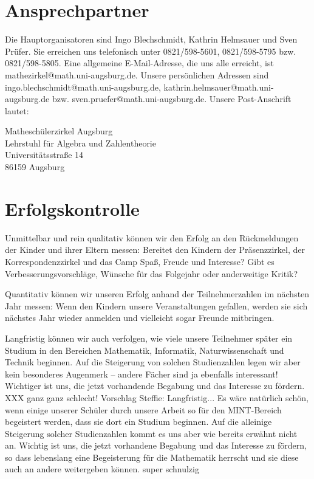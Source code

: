 \documentclass[12pt]{zettel}
\begin{document}
\section{Ansprechpartner}

Die Hauptorganisatoren sind Ingo Blechschmidt, Kathrin Helmsauer und Sven
Prüfer. Sie erreichen uns telefonisch unter 0821/598-5601, 0821/598-5795 bzw.
0821/598-5805. Eine allgemeine E-Mail-Adresse, die uns alle erreicht, ist
\textsf{mathezirkel@math.uni-augsburg.de}. Unsere persönlichen Adressen sind
\textsf{ingo.blechschmidt@math.uni-augsburg.de},
\textsf{kathrin.helmsauer@math.uni-augsburg.de} bzw.
\textsf{sven.pruefer@math.uni-augsburg.de}. Unsere Post-Anschrift lautet:

\begin{tabbing}
  Matheschülerzirkel Augsburg \\
  Lehrstuhl für Algebra und Zahlentheorie \\
  Universitätsstraße 14 \\
  86159 Augsburg
\end{tabbing}


\section{Erfolgskontrolle}

Unmittelbar und rein qualitativ können wir den Erfolg an den Rückmeldungen der
Kinder und ihrer Eltern messen: Bereitet den Kindern der Präsenzzirkel, der
Korrespondenzzirkel und das Camp Spaß, Freude und Interesse? Gibt es
Verbesserungsvorschläge, Wünsche für das Folgejahr oder anderweitige Kritik?

Quantitativ können wir unseren Erfolg anhand der Teilnehmerzahlen im nächsten
Jahr messen: Wenn den Kindern unsere Veranstaltungen gefallen, werden sie sich
nächstes Jahr wieder anmelden und vielleicht sogar Freunde mitbringen.

Langfristig können wir auch verfolgen, wie viele unsere Teilnehmer später ein
Studium in den Bereichen Mathematik, Informatik, Naturwissenschaft und Technik
beginnen. Auf die Steigerung von solchen Studienzahlen legen wir aber kein
besonderes Augenmerk -- andere Fächer sind ja ebenfalls interessant! Wichtiger
ist uns, die jetzt vorhandende Begabung und das Interesse zu fördern. XXX ganz
ganz schlecht!
Vorschlag Steffie:
Langfristig... Es wäre natürlich schön, wenn einige unserer Schüler durch
unsere Arbeit so für den MINT-Bereich begeistert werden, dass sie dort ein
Studium beginnen. Auf die alleinige Steigerung solcher Studienzahlen kommt es
uns aber wie bereits erwähnt nicht an. Wichtig ist uns, die jetzt vorhandene
Begabung und das Interesse zu fördern, so dass lebenslang eine Begeisterung für
die Mathematik herrscht und sie diese auch an andere weitergeben können.
super schnulzig
\end{document}
